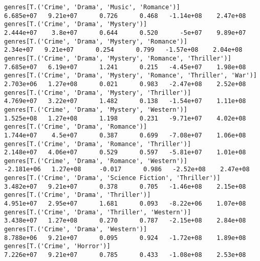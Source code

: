 \documentclass[11pt]{article}
\begin{document}
\begin{Verbatim}[commandchars=\\\{\}]
genres[T.('Crime', 'Drama', 'Music', 'Romance')]                                                              6.685e+07   9.21e+07      0.726      0.468   -1.14e+08    2.47e+08
genres[T.('Crime', 'Drama', 'Mystery')]                                                                       2.444e+07    3.8e+07      0.644      0.520      -5e+07    9.89e+07
genres[T.('Crime', 'Drama', 'Mystery', 'Romance')]                                                             2.34e+07   9.21e+07      0.254      0.799   -1.57e+08    2.04e+08
genres[T.('Crime', 'Drama', 'Mystery', 'Romance', 'Thriller')]                                                7.685e+07   6.19e+07      1.241      0.215   -4.45e+07    1.98e+08
genres[T.('Crime', 'Drama', 'Mystery', 'Romance', 'Thriller', 'War')]                                         2.703e+06   1.27e+08      0.021      0.983   -2.47e+08    2.52e+08
genres[T.('Crime', 'Drama', 'Mystery', 'Thriller')]                                                           4.769e+07   3.22e+07      1.482      0.138   -1.54e+07    1.11e+08
genres[T.('Crime', 'Drama', 'Mystery', 'Western')]                                                            1.525e+08   1.27e+08      1.198      0.231   -9.71e+07    4.02e+08
genres[T.('Crime', 'Drama', 'Romance')]                                                                       1.744e+07    4.5e+07      0.387      0.699   -7.08e+07    1.06e+08
genres[T.('Crime', 'Drama', 'Romance', 'Thriller')]                                                           2.148e+07   4.06e+07      0.529      0.597   -5.81e+07    1.01e+08
genres[T.('Crime', 'Drama', 'Romance', 'Western')]                                                           -2.181e+06   1.27e+08     -0.017      0.986   -2.52e+08    2.47e+08
genres[T.('Crime', 'Drama', 'Science Fiction', 'Thriller')]                                                   3.482e+07   9.21e+07      0.378      0.705   -1.46e+08    2.15e+08
genres[T.('Crime', 'Drama', 'Thriller')]                                                                      4.951e+07   2.95e+07      1.681      0.093   -8.22e+06    1.07e+08
genres[T.('Crime', 'Drama', 'Thriller', 'Western')]                                                           3.438e+07   1.27e+08      0.270      0.787   -2.15e+08    2.84e+08
genres[T.('Crime', 'Drama', 'Western')]                                                                       8.788e+06   9.21e+07      0.095      0.924   -1.72e+08    1.89e+08
genres[T.('Crime', 'Horror')]                                                                                 7.226e+07   9.21e+07      0.785      0.433   -1.08e+08    2.53e+08

\end{Verbatim}
\end{document}
